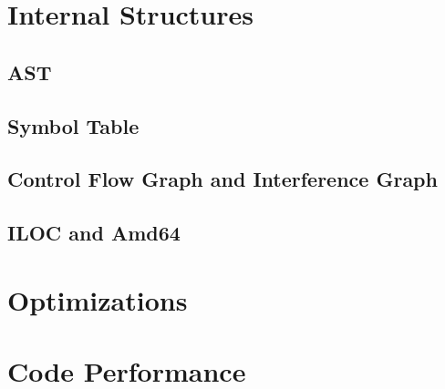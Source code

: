 \documentclass[12pt]{article}
\begin{document}
\section*{Internal Structures}
\subsection*{AST}
\subsection*{Symbol Table}
\subsection*{Control Flow Graph and Interference Graph}
\subsection*{ILOC and Amd64}

\section*{Optimizations}

\section*{Code Performance}
\end{document}
